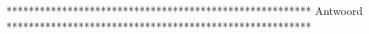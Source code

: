 *******************************************************
Antwoord
*******************************************************